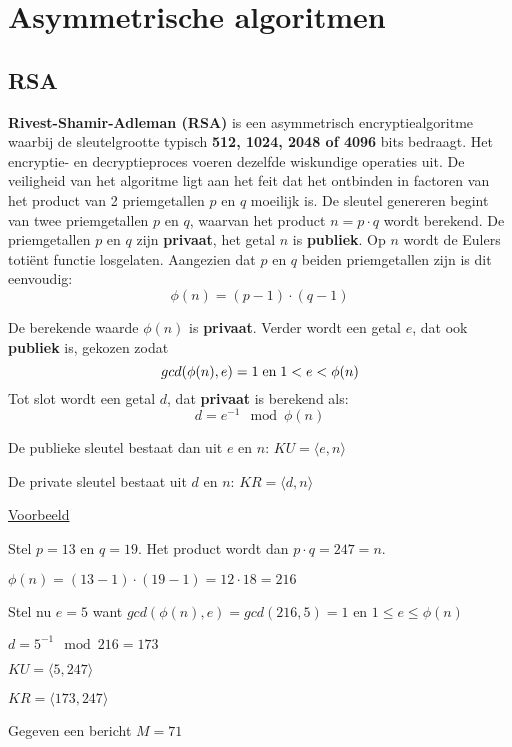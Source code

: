 \documentclass{report}
\begin{document}
	\section{Asymmetrische algoritmen}
	\subsection{RSA}
	\textbf{Rivest-Shamir-Adleman (RSA)} is een asymmetrisch encryptiealgoritme waarbij de sleutelgrootte typisch \textbf{512, 1024, 2048 of 4096} bits bedraagt. Het encryptie- en decryptieproces voeren dezelfde wiskundige operaties uit. De veiligheid van het algoritme ligt aan het feit dat het ontbinden in factoren van het product van 2 priemgetallen $p$ en $q$ moeilijk is. De sleutel genereren begint van twee priemgetallen $p$ en $q$, waarvan het product $n = p\cdot q$ wordt berekend. De priemgetallen $p$ en $q$ zijn \textbf{privaat}, het getal $n$ is \textbf{publiek}. Op $n$ wordt de Eulers totiënt functie losgelaten. Aangezien dat $p$ en $q$ beiden priemgetallen zijn is dit eenvoudig: $$\phi(n) = (p - 1) \cdot (q - 1)$$ 
	
	De berekende waarde $\phi(n)$ is \textbf{privaat}. Verder wordt een getal $e$, dat ook \textbf{publiek} is, gekozen zodat $$gcd(\phi(n), e) = 1 \;\hbox{en}\; 1 < e < \phi(n)$$ Tot slot wordt een getal $d$, dat \textbf{privaat} is berekend als: 
	$$d = e^{-1} \mod \phi(n)$$

	De publieke sleutel bestaat dan uit $e$ en $n$: $KU=\langle e, n \rangle$

	De private sleutel bestaat uit $d$ en $n$: $KR=\langle d, n \rangle$

	\underline{Voorbeeld}

	Stel $p = 13$ en $q = 19$. Het product wordt dan $p \cdot q = 247 = n$.

	$\phi(n) = (13 - 1) \cdot (19 - 1) = 12 \cdot 18 = 216$

	Stel nu $e = 5$ want $gcd(\phi(n), e) = gcd(216, 5) = 1$ en $1 \leq e \leq \phi(n)$

	$d = 5^{-1} \mod 216 = 173$

	$KU = \langle 5, 247 \rangle$

	$KR = \langle 173, 247 \rangle$

	Gegeven een bericht $M = 71$
\end{document}
